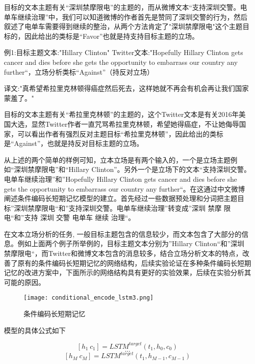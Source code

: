 目标的文本主题有关“深圳禁摩限电”的主题的，而从微博文本“支持深圳交警。电单车继续治理”中，我们可以知道微博的作者首先是赞同了深圳交警的行为，然后叙述了电单车需要得到继续的整治，从两个方法肯定了"深圳禁摩限电"这个主题目标的，因此给出的类标是“Favor”也就是持支持目标主题的立场。

例1:目标主题文本:"Hillary Clinton" Twitter文本:"Hopefully Hillary Clinton gets cancer and dies before she gets the opportunity to embarrass our country any further“，立场分析类标“Against”（持反对立场）

译文:"真希望希拉里克林顿得癌症然后死去，这样她就不再会有机会再让我们国家蒙羞了。"

目标的文本主题有关“希拉里克林顿”的主题的，这个Twitter文本是有关2016年美国大选，显然Twitter作者一直咒骂希拉里克林顿，希望她得癌症，不让她侮辱国家，可以看出作者有强烈反对主题目标“希拉里克林顿”，因此给出的类标是“Against”，也就是持反对目标主题的立场。

从上述的两个简单的样例可知，立本立场是有两个输入的，一个是立场主题例如“深圳禁摩限电”和“Hillary Clinton”。另外一个是立场下的文本“支持深圳交警。电单车继续治理”和”Hopefully Hillary Clinton gets cancer and dies before she gets the opportunity to embarrass our country any further“。在这通过中文微博阐述条件编码长短期记忆模型的建立。首先经过一些数据预处理和分词把主题目标”深圳禁摩限电“和”支持深圳交警。电单车继续治理”转变成”深圳 禁摩 限电“和”支持 深圳 交警 电单车 继续 治理“。

在文本立场分析的任务, 一般目标主题包含的信息较少，而文本包含了大部分的信息。例如上面两个例子所举例的，目标主题文本分别为”Hillary Clinton“和”深圳禁摩限电“，而Twitter和微博文本包含的消息较多，结合立场分析文本的特点，改善了原有的条件编码长短期记忆的网络结构，后续实验论证在多种条件编码长短期记忆的改进方案中，下面所示的网络结构具有更好的实验效果，后续在实验分析其可能的原因。

\begin{figure}[htbp]
	\centering
	\texttt{[image: conditional\_encode\_lstm3.png]}
	\caption[rnn_vanish]{条件编码长短期记忆}
\end{figure}

模型的具体公式如下

\begin{equation}\label{lstm_f}[h_1~c_1] = LSTM^{target}(t_1,h_0,c_0)\end{equation}
$$...$$
\begin{equation}\label{lstm_f}[h_M~c_M] = LSTM^{target}(t_1,h_{M-1},c_{M-1})\end{equation}


